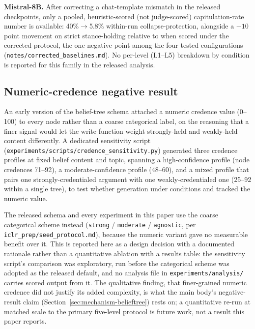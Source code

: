\textbf{Mistral-8B.} After correcting a chat-template mismatch in the released
checkpoints, only a pooled, heuristic-scored (not judge-scored) capitulation-rate
number is available: 40\%\(\to\)5.8\% within-run collapse-protection, alongside a
\(-10\) point movement on strict stance-holding relative to \condB{} when scored under
the corrected protocol, the one negative point among the four tested configurations
(\texttt{notes/corrected\_baselines.md}). No per-level (L1--L5) breakdown by condition
is reported for this family in the released analysis.

\subsection{Numeric-credence negative result}
\label{app:credence-ablation}

An early version of the belief-tree schema attached a numeric credence value (0--100)
to every node rather than a coarse categorical label, on the reasoning that a finer
signal would let the write function weight strongly-held and weakly-held content
differently. A dedicated sensitivity script
(\texttt{experiments/scripts/credence\_sensitivity.py}) generated three credence
profiles at fixed belief content and topic, spanning a high-confidence profile
(node credences 71--92), a moderate-confidence profile (48--60), and a mixed profile
that pairs one strongly-credentialed argument with one weakly-credentialed one
(25--92 within a single tree), to test whether generation under conditions \condB{}
and \condD{} tracked the numeric value.

The released schema and every experiment in this paper use the coarse categorical
scheme instead (\texttt{strong} / \texttt{moderate} / \texttt{agnostic}, per
\texttt{iclr\_prep/seed\_protocol.md}), because the numeric variant gave no measurable
benefit over it. This is reported here as a design decision with a documented rationale
rather than a quantitative ablation with a results table: the sensitivity script's
comparison was exploratory, run before the categorical scheme was adopted as the
released default, and no analysis file in \texttt{experiments/analysis/} carries scored
output from it. The qualitative finding, that finer-grained numeric credence did not
justify its added complexity, is what the main body's negative-result claim
(Section~\ref{sec:mechanism-belieftree}) rests on; a quantitative re-run at matched
scale to the primary five-level protocol is future work, not a result this paper
reports.

